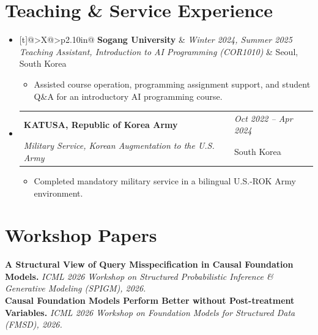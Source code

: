 \documentclass[11pt,a4paper]{article}
\makeatletter
\newcommand{\cvitem}[4]{%
  \item \begin{tabularx}{\linewidth}[t]{@{}>{\RaggedRight\arraybackslash}X@{\hspace{0.8em}}>{\RaggedLeft\arraybackslash}p{2.10in}@{}}
  \textbf{#1} & \textit{#2}\\
  \textit{#3} & #4
  \end{tabularx}\vspace{-0.18em}
}
\newcommand{\paperitem}[2]{%
  \noindent\makebox[2.2em][l]{\textbf{[#1]}}#2\par\vspace{0.34em}
}
\makeatother
\begin{document}
\section*{Teaching \& Service Experience}
\begin{itemize}[label=$\bullet$, leftmargin=0.70em]
  \cvitem{Sogang University}{Winter 2024, Summer 2025}{Teaching Assistant, Introduction to AI Programming (COR1010)}{Seoul, South Korea}
  \begin{itemize}
    \item Assisted course operation, programming assignment support, and student Q\&A for an introductory AI programming course.
  \end{itemize}

  \cvitem{KATUSA, Republic of Korea Army}{Oct 2022 -- Apr 2024}{Military Service, Korean Augmentation to the U.S. Army}{South Korea}
  \begin{itemize}
    \item Completed mandatory military service in a bilingual U.S.-ROK Army environment.
  \end{itemize}
\end{itemize}

\section*{Workshop Papers}
\paperitem{1}{\textbf{A Structural View of Query Misspecification in Causal Foundation Models.} \textit{ICML 2026 Workshop on Structured Probabilistic Inference \& Generative Modeling (SPIGM), 2026.}\\
\textbf{Causal Foundation Models Perform Better without Post-treatment Variables.} \textit{ICML 2026 Workshop on Foundation Models for Structured Data (FMSD), 2026.}}
\end{document}
